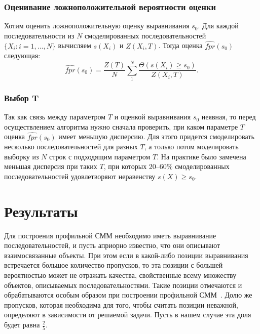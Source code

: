 \documentclass[specialist,
substylefile = spbu_report.rtx,
subf,href,colorlinks=true, 12pt]{disser}
\begin{document}
			\subsection{Оценивание ложноположительной вероятности оценки}			
				Хотим оценить ложноположительную оценку выравнивания $s_{0}$. Для каждой последовательности из $N$ смоделированных последовательностей $\{X_{i}:i=1,\dots,N\}$ вычисляем $s(X_{i})$ и $Z(X_{i}, T)$. Тогда оценка $\widehat{fpr}(s_{0})$ следующая:
				\begin{equation*}	
					\widehat{fpr}(s_{0}) = \frac{Z(T)}{N} \sum_{1}^{N} \frac{\Theta(s(X_{i}) \geq s_{0})}{Z(X_{i}, T)}.
					\label{eq:16}
				\end{equation*}							
			
			\subsection{Выбор T}
				Так как связь между параметром $T$ и оценкой выравнивания $s_{0}$ неявная, то перед осуществлением алгоритма нужно сначала проверить, при каком параметре $T$ оценка $\widehat{fpr}(s_{0})$ имеет меньшую дисперсию. Для этого придется смоделировать несколько последовательностей для разных $T$, а только потом моделировать выборку из $N$ строк с подходящим параметром $T$. На практике было замечена меньшая дисперсия при таких $T$, при которых 20--60$\%$ смоделированных последовательностей удовлетворяют неравенству $s(X) \geq s_{0}$.

		\chapter{Результаты}						
			Для построения профильной СММ необходимо иметь выравнивание последовательностей, и пусть априорно известно, что они описывают взаимосвязанные объекты. При этом если в какой-либо позиции выравнивания встречается большое количество пропусков, то эта позиции с большей вероятностью может не отражать качества, свойственные всему множеству объектов, описываемых последовательностями. Такие позиции отмечаются и обрабатываются особым образом при построении профильной СММ~\cite{Compeau2015a}. Долю же пропусков, которая необходима для того, чтобы считать позиции неважной, определяют в зависимости от решаемой задачи. Пусть в нашем случае эта доля будет равна $\frac{2}{5}$.
			
\end{document}
